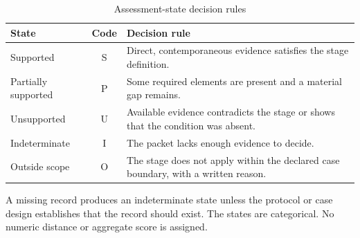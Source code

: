 \begin{table}[t]
\centering
\begin{threeparttable}
\caption{Assessment-state decision rules}
\label{tab:state-rules}
\begin{tabularx}{\linewidth}{l c X}
\toprule
State & Code & Decision rule \\
\midrule
Supported & S & Direct, contemporaneous evidence satisfies the stage definition. \\
Partially supported & P & Some required elements are present and a material gap remains. \\
Unsupported & U & Available evidence contradicts the stage or shows that the condition was absent. \\
Indeterminate & I & The packet lacks enough evidence to decide. \\
Outside scope & O & The stage does not apply within the declared case boundary, with a written reason. \\
\bottomrule
\end{tabularx}
\begin{tablenotes}[flushleft]\footnotesize
\item A missing record produces an indeterminate state unless the protocol or case design establishes that the record should exist. The states are categorical. No numeric distance or aggregate score is assigned.
\end{tablenotes}
\end{threeparttable}
\end{table}

